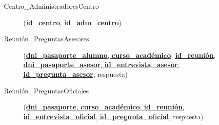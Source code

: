   \begin{description}
    \item[Centro\_AdministradoresCentro] \begin{flushleft}(\underline{\textbf{id\_centro},
    \textbf{id\_adm\_centro}})\end{flushleft}
  \end{description}

  \begin{description}
    \item[Reunión\_PreguntasAsesores] \begin{flushleft}(\underline{\textbf{dni\_pasaporte\_alumno}, \textbf{curso\_académico},}
    \underline{\textbf{id\_reunión}, \textbf{dni\_pasaporte\_asesor},
    \textbf{id\_entrevista\_asesor},} \underline{\textbf{id\_pregunta\_asesor}},
    respuesta)\end{flushleft}
   \end{description}

  \begin{description}
    \item[Reunión\_PreguntasOficiales] \begin{flushleft}(\underline{\textbf{dni\_pasaporte}, \textbf{curso\_académico},
    \textbf{id\_reunión}}, \underline{\textbf{id\_entrevista\_oficial},
    \textbf{id\_pregunta\_oficial}}, respuesta)\end{flushleft}
  \end{description}
